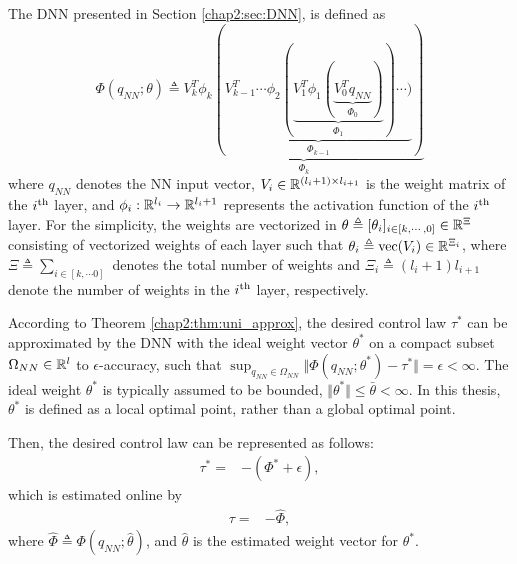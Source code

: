 The DNN presented in Section \ref{chap2:sec:DNN}, is defined as 
\begin{equation}
    \Phi(q_{NN};\theta) \triangleq 
    \underbrace{
        V_k^T  \phi_{k}(
        \underbrace{
        V_{k-1}^T   \cdots \phi_2(
        \underbrace
            {
            V_1^T   \phi_1(
            \underbrace
            {
            V_0^T   q_{NN}
            }_{\Phi_0}
            )
        }_{\Phi_1}
        )\cdots )
        }_{\Phi_{k-1}}
        )
    }_{\Phi_k}
\end{equation}
where $q_{NN}$ denotes the NN input vector, $V_i\in\mathbb{R}^{(l_i+1)\times l_{i+1}}$ is the weight matrix of the $i\textsuperscript{th}$ layer, and $\phi_i: \mathbb{R}^{l_i}\to\mathbb{R}^{l_i+1}$ represents the activation function of the $i\textsuperscript{th}$ layer.
For the simplicity, the weights are vectorized in $\theta\triangleq[\theta_i]_{i\in[k,\cdots,0]}\in\mathbb{R}^{\Xi}$ consisting of vectorized weights of each layer such that $\theta_i\triangleq\text{vec}(V_i)\in\mathbb{R}^{\Xi_i}$, where $\Xi\triangleq \sum_{i\in[k,\cdots 0]}$ denotes the total number of weights and $\Xi_i\triangleq (l_i+1)l_{i+1}$ denote the number of weights in the $i\textsuperscript{th}$ layer, respectively.

According to Theorem \ref{chap2:thm:uni_approx}, the desired control law $\tau^*$ can be approximated by the DNN with the ideal weight vector $\theta^*$ on a compact subset $\Omega_{NN}\in\mathbb{R}^{l}$ to $\epsilon$-accuracy, such that $\sup_{q_{NN}\in\Omega_{NN}}\Vert \Phi(q_{NN};\theta^*) - \tau^* \Vert = \epsilon < \infty$.
The ideal weight $\theta^*$ is typically assumed to be bounded, \ie $\Vert\theta^*\Vert\le \bar\theta<\infty$.
In this thesis, $\theta^*$ is defined as a local optimal point, rather than a global optimal point.

Then, the desired control law can be represented as follows:
\begin{align}
    \tau^*=& -(\Phi^*+\epsilon),
\end{align}
which is estimated online by
\begin{align}
    \tau =& -\hat\Phi,
    \label{chap4:eq:approx_control}
\end{align}
where $\hat\Phi\triangleq\Phi(q_{NN};\hat\theta)$, and  $\hat\theta$ is the estimated weight vector for $\theta^*$.


